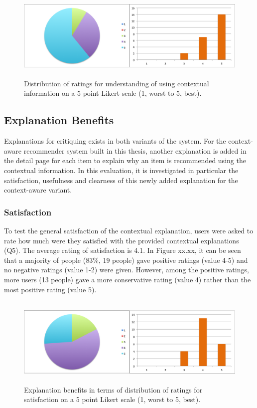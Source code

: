 \begin{figure}[H]
	\centering
	\includegraphics[height=1.7in]{figures/contextBenefits.png}
	\caption{Distribution of ratings for understanding of using contextual information on a 5 point Likert scale (1, worst to 5, best).}
	\label{fig:contextBenefits}
\end{figure}

\subsection{Explanation Benefits} \label{sec:results_eb}

Explanations for critiquing exists in both variants of the system. For the context-aware recommender system built in this thesis, another explanation is added in the detail page for each item to explain why an item is recommended using the contextual information. In this evaluation, it is investigated in particular the satisfaction, usefulness and clearness of this newly added explanation for the context-aware variant.

\subsubsection{Satisfaction} \label{sec:results_eb_s}

To test the general satisfaction of the contextual explanation, users were asked to rate how much were they satisfied with the provided contextual explanations (Q5). The average rating of satisfaction is 4.1. In Figure xx.xx, it can be seen that a majority of people (83\%, 19 people) gave positive ratings (value 4-5) and no negative ratings (value 1-2) were given. However, among the positive ratings, more users (13 people) gave a more conservative rating (value 4) rather than the most positive rating (value 5).

\begin{figure}[H]
	\centering
	\includegraphics[height=1.7in]{figures/satisfaction.png}
	\caption{Explanation benefits in terms of distribution of ratings for satisfaction on a 5 point Likert scale (1, worst to 5, best).}
	\label{fig:satisfaction}
\end{figure}

